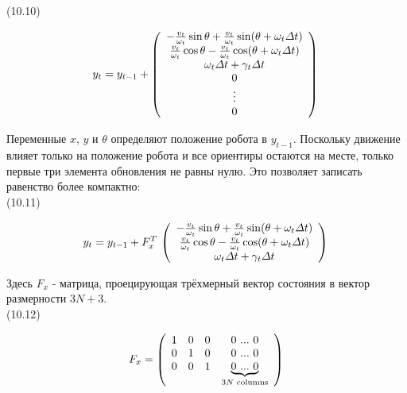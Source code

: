 \documentclass[10pt,a4paper]{article}
\begin{document}
(10.10)
\begin{minipage}{0.2\textwidth}
\begin{equation*}
y_t=y_{t-1}+\left(\begin{array}{c} 
-\frac{v_t}{\omega_t}\sin\theta+\frac{v_t}{\omega_t}\sin(\theta+\omega_t\varDelta t)\\	\frac{v_t}{\omega_t}\cos\theta-\frac{v_t}{\omega_t}\cos(\theta+\omega_t\varDelta t)\\	\omega_t\varDelta t+\gamma_t\varDelta t\\
0\\
\vdots\\
0\\
\end{array} \right)\\
\end{equation*}
\end{minipage}

Переменные $x$, $y$ и $\theta$ определяют положение робота в $y_{t-1}$. Поскольку движение влияет только на положение робота и все ориентиры остаются на месте, только первые три элемента обновления не равны нулю. Это позволяет записать равенство более компактно:\\

(10.11)
\begin{minipage}{0.2\textwidth}
\begin{equation*}
y_t=y_{t-1}+F_x^T\,\left(\begin{array}{c} 
-\frac{v_t}{\omega_t}\sin\theta+\frac{v_t}{\omega_t}\sin(\theta+\omega_t\varDelta t)\\	\frac{v_t}{\omega_t}\cos\theta-\frac{v_t}{\omega_t}\cos(\theta+\omega_t\varDelta t)\\	\omega_t\varDelta t+\gamma_t\varDelta t\\
\end{array} \right)\\
\end{equation*}
\end{minipage}

Здесь $F_x$ - матрица, проецирующая трёхмерный вектор состояния в вектор размерности $3N + 3$.\\

(10.12)
\begin{minipage}{0.2\textwidth}
\begin{equation*}
F_x=\left(\begin{array}{cccc} 
1&0&0&0\,\,...\,\,0\\
0&1&0&0\,\,...\,\,0\\
0&0&1&\underbrace{0\,\,...\,\,0}_{3N\,\,\text{columns}}\\
\end{array} \right)\\
\end{equation*}
\end{minipage}
\end{document}
